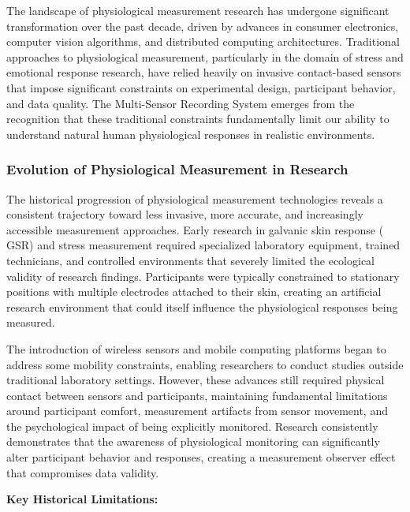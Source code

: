 \documentclass[12pt,a4paper]{report}
\begin{document}
The landscape of physiological measurement research has undergone significant transformation over the past decade,
driven by advances in consumer electronics, computer vision algorithms, and distributed computing architectures.
Traditional approaches to physiological measurement, particularly in the domain of stress and emotional response
research, have relied heavily on invasive contact-based sensors that impose significant constraints on experimental
design, participant behavior, and data quality. The Multi-Sensor Recording System emerges from the recognition that
these traditional constraints fundamentally limit our ability to understand natural human physiological responses in
realistic environments.

\subsubsection{Evolution of Physiological Measurement in Research}

The historical progression of physiological measurement technologies reveals a consistent trajectory toward less
invasive, more accurate, and increasingly accessible measurement approaches. Early research in galvanic skin response (
GSR) and stress measurement required specialized laboratory equipment, trained technicians, and controlled environments
that severely limited the ecological validity of research findings. Participants were typically constrained to
stationary positions with multiple electrodes attached to their skin, creating an artificial research environment that
could itself influence the physiological responses being measured.

The introduction of wireless sensors and mobile computing platforms began to address some mobility constraints, enabling
researchers to conduct studies outside traditional laboratory settings. However, these advances still required physical
contact between sensors and participants, maintaining fundamental limitations around participant comfort, measurement
artifacts from sensor movement, and the psychological impact of being explicitly monitored. Research consistently
demonstrates that the awareness of physiological monitoring can significantly alter participant behavior and responses,
creating a measurement observer effect that compromises data validity.

\textbf{Key Historical Limitations:}
\end{document}
